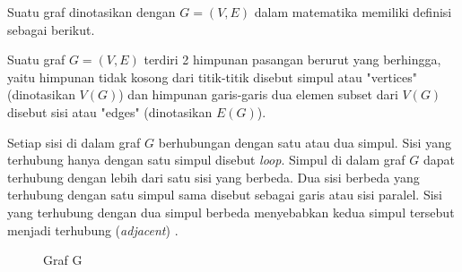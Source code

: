 {{        Suatu graf dinotasikan dengan $G=(V,E)$ dalam matematika memiliki definisi sebagai berikut.
        \begin{definisi}
            \label{def:Graf}
            Suatu graf $G=(V,E)$ terdiri 2 himpunan pasangan berurut yang berhingga, yaitu himpunan
            tidak kosong dari titik-titik disebut simpul atau "vertices" (dinotasikan $V(G)$) dan
            himpunan garis-garis dua elemen subset dari $V(G)$ disebut sisi atau "edges" (dinotasikan $E(G)$).
        \end{definisi}
        \noindent
        Setiap sisi di dalam graf $G$ berhubungan dengan satu atau dua simpul.
        Sisi yang terhubung hanya dengan satu simpul disebut \textit{loop}.
        Simpul di dalam graf $G$ dapat terhubung dengan lebih dari satu sisi yang berbeda.
        Dua sisi berbeda yang terhubung dengan satu simpul sama disebut sebagai garis atau sisi paralel.
        Sisi yang terhubung dengan dua simpul berbeda menyebabkan kedua simpul tersebut menjadi terhubung (\textit{adjacent}) .

        \begin{figure}
            \centering
            \vspace{-7mm}
            \caption{Graf G}
            \label{gam:Graf G}
        \end{figure}
    }

    \vspace{-5mm}
}
